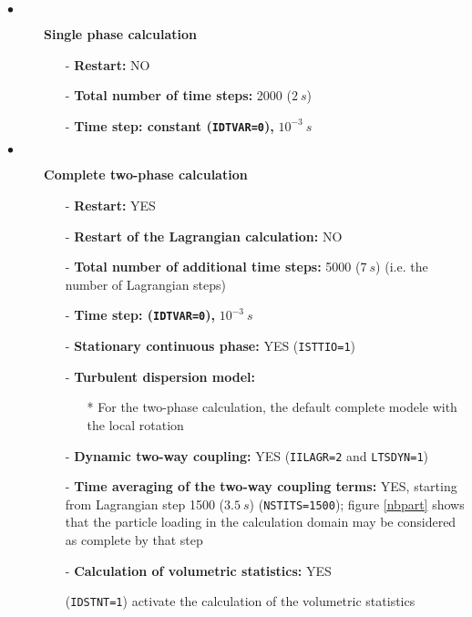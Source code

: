 \begin{description}

   \item[$\bullet$]\textbf{Single phase calculation}
         \begin{itemize}
            \item[-] {\bf Restart:} NO
            \item[-] {\bf Total number of time steps:} 2000 ($2~s$)
            \item[-] {\bf Time step: constant (\texttt{IDTVAR=0}), } $10^{-3}~s$
         \end{itemize}


   \item[$\bullet$]\textbf{Complete two-phase calculation}
         \begin{itemize}
            \item[-] {\bf Restart:} YES
            \item[-] {\bf Restart of the Lagrangian calculation:} NO
            \item[-] {\bf Total number of additional time steps:} 5000 ($7~s$)
                  (i.e. the number of Lagrangian steps)
            \item[-] {\bf Time step: (\texttt{IDTVAR=0}),} $10^{-3}~s$
            \item[-] \textbf{Stationary continuous phase:} YES (\texttt{ISTTIO=1})

            \item[-] {\bf Turbulent dispersion model:}
                  \begin{itemize}
                     \item[*] For the two-phase calculation, the default complete modele with the local rotation

                  \end{itemize}
            \item[-] {\bf Dynamic two-way coupling:} YES (\texttt{IILAGR=2} and \texttt{LTSDYN=1})
            \item[-] {\bf Time averaging of the two-way coupling terms:} YES, starting from Lagrangian step 1500 ($3.5~s$) (\texttt{NSTITS=1500}); figure
                  \ref{nbpart} shows that the particle loading in the calculation domain may be considered as complete by that step
            \item[-] {\bf Calculation of volumetric statistics:} YES

                  (\texttt{IDSTNT=1}) activate the calculation of the volumetric statistics


\end{itemize}
\end{description}
